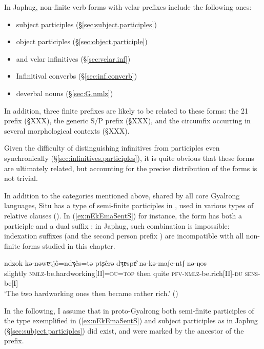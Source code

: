 In Japhug, non-finite verb forms with velar prefixes include the following ones:

\begin{itemize}
\item {} subject participles (§\ref{sec:subject.participles})
\item {} object participles (§\ref{sec:object.participle})
\item {} and  velar infinitives (§\ref{sec:velar.inf})
\item Infinitival converbs (§\ref{sec:inf.converb})
\item {} deverbal nouns (§\ref{sec:G.nmlz})
\end{itemize}

In addition, three finite prefixes are likely to be related to these forms: the 2\fl{}1  prefix (§XXX), the generic S/P  prefix (§XXX), and the circumfix  occurring in several morphological contexts (§XXX).

Given the difficulty of distinguishing infinitives from participles even synchronically (§\ref{sec:infinitives.participles}), it is quite obvious that these forms are ultimately related, but accounting for the precise distribution of the forms is not trivial.

In addition to the categories mentioned above, shared by all core Gyalrong languages, Situ has a type of semi-finite participles in , used in various types of relative clauses (\citealt{jacksonlin07}). In (\ref{ex:nEkEmaSentS}) for instance, the form  has both a participle  and a dual suffix ; in Japhug, such combination is impossible: indexation suffixes (and the second person prefix ) are incompatible with all non-finite forms studied in this chapter. 

\begin{exe}
\ex \label{ex:nEkEmaSentS} 
\gll  ndzok kǝ-nǝwɐtjô=ndʒês=tǝ ptʂêrǝ dʒɐspɐ̂ nǝ-kǝ-maʃe-ntʃ nǝ-ŋos \\
slightly \textsc{nmlz}-be.hardworking[II]=\textsc{du}=\textsc{top} then quite \textsc{pfv}-\textsc{nmlz}-be.rich[II]-\textsc{du} \textsc{sens}-be[I] \\
\glt `The two hardworking ones then became rather rich.' (\citealt[193-194]{lin09phd})
\end{exe}

In the following, I assume that in proto-Gyalrong both semi-finite participles of the type exemplified in (\ref{ex:nEkEmaSentS}) and subject participles as in Japhug (§\ref{sec:subject.participles}) did exist, and were marked by the ancestor of the  prefix.

